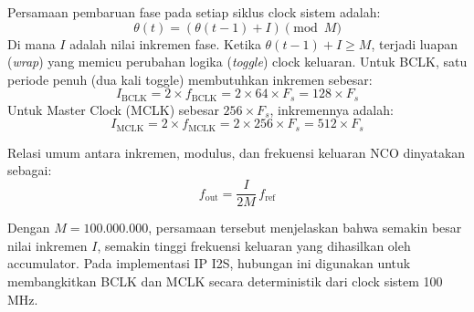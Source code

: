 Persamaan pembaruan fase pada setiap siklus clock sistem adalah:
\begin{equation}
    \theta(t) = (\theta(t-1) + I) \pmod M
    
\end{equation}
Di mana $I$ adalah nilai inkremen fase. Ketika $\theta(t-1) + I \ge M$, terjadi luapan (\textit{wrap}) yang memicu perubahan logika (\textit{toggle}) clock keluaran. Untuk BCLK, satu periode penuh (dua kali toggle) membutuhkan inkremen sebesar:
\begin{equation}
    I_{\mathrm{BCLK}} = 2 \times f_{\mathrm{BCLK}} = 2 \times 64 \times F_s = 128 \times F_s
    
\end{equation}
Untuk Master Clock (MCLK) sebesar $256 \times F_s$, inkremennya adalah:
\begin{equation}
    I_{\mathrm{MCLK}} = 2 \times f_{\mathrm{MCLK}} = 2 \times 256 \times F_s = 512 \times F_s
    
\end{equation}

Relasi umum antara inkremen, modulus, dan frekuensi keluaran NCO dinyatakan sebagai:
\begin{equation}
    f_{\mathrm{out}} = \frac{I}{2M} \, f_{\mathrm{ref}}
    
\end{equation}

Dengan $M = 100.000.000$, persamaan tersebut menjelaskan bahwa semakin besar nilai inkremen $I$, semakin tinggi frekuensi keluaran yang dihasilkan oleh accumulator. Pada implementasi IP I2S, hubungan ini digunakan untuk membangkitkan BCLK dan MCLK secara deterministik dari clock sistem 100 MHz.

